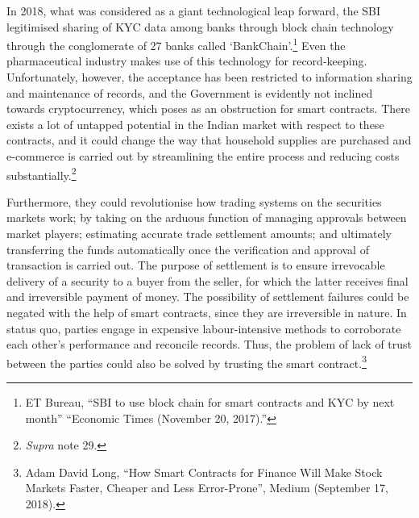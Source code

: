 \begin{multicols}{2}
\noi
In 2018, what was considered as a giant technological leap forward, the SBI legitimised
sharing of KYC data among banks through block chain technology through the conglomerate
of 27 banks called ‘BankChain’.\footnote{ET Bureau, “SBI to use block chain for smart contracts and KYC by next month” “Economic Times
(November 20, 2017).”} Even the pharmaceutical industry makes use of this technology for record-keeping. Unfortunately, however, the acceptance has been restricted to
information sharing and maintenance of records, and the Government is evidently not
inclined towards cryptocurrency, which poses as an obstruction for smart contracts. There
exists a lot of untapped potential in the Indian market with respect to these contracts, and it
could change the way that household supplies are purchased and e-commerce is carried out
by streamlining the entire process and reducing costs substantially.\footnote{\textit{Supra} note 29. }

\vspace{-.1cm}

\noi
Furthermore, they could revolutionise how trading systems on the securities markets work;
by taking on the arduous function of managing approvals between market players; estimating
accurate trade settlement amounts; and ultimately transferring the funds automatically once
the verification and approval of transaction is carried out. The purpose of settlement is to
ensure irrevocable delivery of a security to a buyer from the seller, for which the latter
receives final and irreversible payment of money. The possibility of settlement failures could
be negated with the help of smart contracts, since they are irreversible in nature. In status
quo, parties engage in expensive labour-intensive methods to corroborate each other’s
performance and reconcile records. Thus, the problem of lack of trust between the parties
could also be solved by trusting the smart contract.\footnote{Adam David Long, “How Smart Contracts for Finance Will Make Stock Markets Faster, Cheaper and Less
Error-Prone”, Medium (September 17, 2018).}

\vspace{-.1cm}


\vspace{-.2cm}


\end{multicols}
